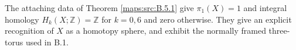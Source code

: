 \begin{theorem}\hypertarget{tag-02JC}{}\label{maps:src:B.5.2}



The attaching data of Theorem \ref{maps:src:B.5.1} give
$\pi_1(X)=1$ and integral homology
$H_k(X;\mathbb Z)=\mathbb Z$ for $k=0,6$ and zero
otherwise.  They give an explicit recognition of $X$
as a homotopy sphere, and exhibit the normally framed
three-torus used in B.1.

\end{theorem}

